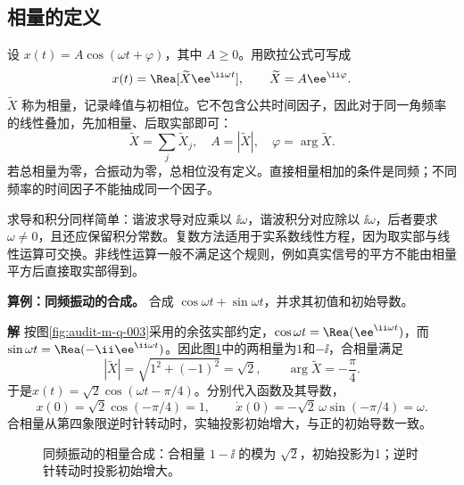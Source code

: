 \documentclass[11pt,openany,fontset=fandol]{ctexbook}
\theoremstyle{plain}\newtheorem{theorem}{定理}[chapter]\newtheorem{proposition}[theorem]{命题}
\theoremstyle{definition}\newtheorem{definition}{定义}[chapter]\newtheorem{example}{例}[chapter]
\theoremstyle{remark}\newtheorem*{remark}{说明}
\newcommand{\SolutionStart}{\par\nobreak\medskip\nobreak\noindent\textbf{解}\quad\ignorespaces}
\newenvironment{solution}{\SolutionStart}{\par\medskip}
\begin{document}
\subsection{相量的定义}
设 $x(t)=A\cos(\omega t+\varphi)$，其中 $A\ge0$。用欧拉公式可写成
\begin{equation}
x(t)=\Rea[\widetilde X\ee^{\ii\omega t}],\qquad \widetilde X=A\ee^{\ii\varphi}.
\end{equation}
$\widetilde X$ 称为相量，记录峰值与初相位。它不包含公共时间因子，因此对于同一角频率的线性叠加，先加相量、后取实部即可：
\begin{equation}
\widetilde X=\sum_j\widetilde X_j,\quad A=|\widetilde X|,\quad\varphi=\arg\widetilde X.
\end{equation}
若总相量为零，合振动为零，总相位没有定义。直接相量相加的条件是同频；不同频率的时间因子不能抽成同一个因子。

求导和积分同样简单：谐波求导对应乘以 $\ii\omega$，谐波积分对应除以 $\ii\omega$，后者要求 $\omega\ne0$，且还应保留积分常数。复数方法适用于实系数线性方程，因为取实部与线性运算可交换。非线性运算一般不满足这个规则，例如真实信号的平方不能由相量平方后直接取实部得到。

\textbf{算例：同频振动的合成。} 合成 $\cos\omega t+\sin\omega t$，并求其初值和初始导数。

\begin{solution}
按图\ref{fig:audit-m-q-003}采用的余弦实部约定，$\cos\omega t=\Rea(\ee^{\ii\omega t})$，而
$\sin\omega t=\Rea(-\ii\ee^{\ii\omega t})$。因此图\ref{fig:warm-1}中的两相量为$1$和$-\ii$，合相量满足
\[
 |\widetilde X|=\sqrt{1^2+(-1)^2}=\sqrt2,\qquad
 \arg\widetilde X=-\frac\pi4.
\]
于是$x(t)=\sqrt2\cos(\omega t-\pi/4)$。分别代入函数及其导数，
\[
 x(0)=\sqrt2\cos(-\pi/4)=1,\qquad
 \dot x(0)=-\sqrt2\,\omega\sin(-\pi/4)=\omega.
\]
合相量从第四象限逆时针转动时，实轴投影初始增大，与正的初始导数一致。

\begin{figure}[H]\centering
{}
\caption{同频振动的相量合成：合相量 $1-\ii$ 的模为 $\sqrt2$，初始投影为1；逆时针转动时投影初始增大。}\label{fig:warm-1}
\end{figure}
\end{solution}
\end{document}
